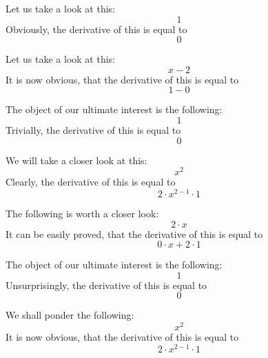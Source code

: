 \documentclass{article}
\begin{document}
Let us take a look at this:
\begin{equation}
1 
\end{equation}
Obviously, the derivative of this is equal to
\begin{equation}
0 
\end{equation}

Let us take a look at this:
\begin{equation}
x - 2 
\end{equation}
It is now obvious, that the derivative of this is equal to
\begin{equation}
1 - 0 
\end{equation}

The object of our ultimate interest is the following:
\begin{equation}
1 
\end{equation}
Trivially, the derivative of this is equal to
\begin{equation}
0 
\end{equation}

We will take a closer look at this:
\begin{equation}
x ^{2 } 
\end{equation}
Clearly, the derivative of this is equal to
\begin{equation}
2 \cdot x ^{2 - 1 } \cdot 1 
\end{equation}

The following is worth a closer look:
\begin{equation}
2 \cdot x 
\end{equation}
It can be easily proved, that the derivative of this is equal to
\begin{equation}
0 \cdot x + 2 \cdot 1 
\end{equation}

The object of our ultimate interest is the following:
\begin{equation}
1 
\end{equation}
Unsurprisingly, the derivative of this is equal to
\begin{equation}
0 
\end{equation}

We shall ponder the following:
\begin{equation}
x ^{2 } 
\end{equation}
It is now obvious, that the derivative of this is equal to
\begin{equation}
2 \cdot x ^{2 - 1 } \cdot 1 
\end{equation}
\end{document}
